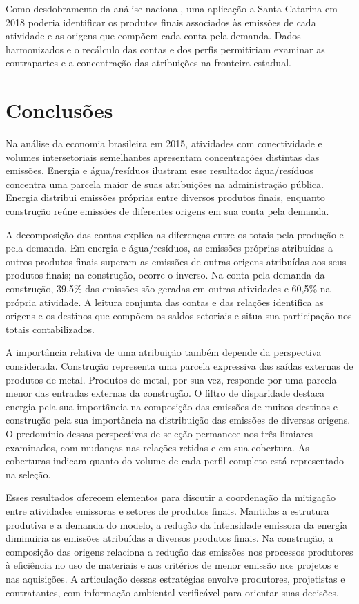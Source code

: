 \documentclass[11pt]{article}
\begin{document}
Como desdobramento da análise nacional, uma aplicação a Santa Catarina em 2018 poderia identificar os produtos finais associados às emissões de cada atividade e as origens que compõem cada conta pela demanda. Dados harmonizados e o recálculo das contas e dos perfis permitiriam examinar as contrapartes e a concentração das atribuições na fronteira estadual.

\section{Conclusões}

Na análise da economia brasileira em 2015, atividades com conectividade e volumes intersetoriais semelhantes apresentam concentrações distintas das emissões. Energia e água/resíduos ilustram esse resultado: água/resíduos concentra uma parcela maior de suas atribuições na administração pública. Energia distribui emissões próprias entre diversos produtos finais, enquanto construção reúne emissões de diferentes origens em sua conta pela demanda.

A decomposição das contas explica as diferenças entre os totais pela produção e pela demanda. Em energia e água/resíduos, as emissões próprias atribuídas a outros produtos finais superam as emissões de outras origens atribuídas aos seus produtos finais; na construção, ocorre o inverso. Na conta pela demanda da construção, 39,5\% das emissões são geradas em outras atividades e 60,5\% na própria atividade. A leitura conjunta das contas e das relações identifica as origens e os destinos que compõem os saldos setoriais e situa sua participação nos totais contabilizados.

A importância relativa de uma atribuição também depende da perspectiva considerada. Construção representa uma parcela expressiva das saídas externas de produtos de metal. Produtos de metal, por sua vez, responde por uma parcela menor das entradas externas da construção. O filtro de disparidade destaca energia pela sua importância na composição das emissões de muitos destinos e construção pela sua importância na distribuição das emissões de diversas origens. O predomínio dessas perspectivas de seleção permanece nos três limiares examinados, com mudanças nas relações retidas e em sua cobertura. As coberturas indicam quanto do volume de cada perfil completo está representado na seleção.

Esses resultados oferecem elementos para discutir a coordenação da mitigação entre atividades emissoras e setores de produtos finais. Mantidas a estrutura produtiva e a demanda do modelo, a redução da intensidade emissora da energia diminuiria as emissões atribuídas a diversos produtos finais. Na construção, a composição das origens relaciona a redução das emissões nos processos produtores à eficiência no uso de materiais e aos critérios de menor emissão nos projetos e nas aquisições. A articulação dessas estratégias envolve produtores, projetistas e contratantes, com informação ambiental verificável para orientar suas decisões.
\end{document}
